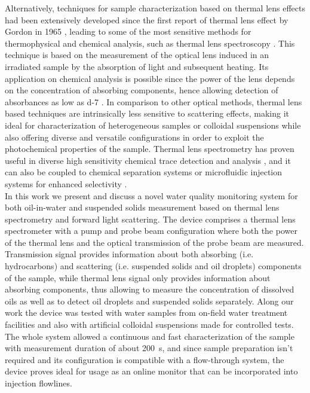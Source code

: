 \documentclass[9pt,twocolumn,twoside]{osajnl}
\begin{document}
Alternatively, techniques for sample characterization based on thermal lens effects had been extensively developed since the first report of thermal lens effect by Gordon in 1965 \cite{Gordon1965}, leading to some of the most sensitive methods for thermophysical and chemical analysis, such as thermal lens spectroscopy \cite{Franko2010,Liu2016}. This technique is based on the measurement of the optical lens induced in an irradiated sample by the absorption of light and subsequent heating. Its application on chemical analysis is possible since the power of the lens depends on the concentration of absorbing components, hence allowing detection of absorbances as low as \SI{d-7}{\arb} \cite{Proskurnin2015}. In comparison to other optical methods, thermal lens based techniques are intrinsically less sensitive to scattering effects, making it ideal for characterization of heterogeneous samples or colloidal suspensions while also offering diverse and versatile configurations in order to exploit the photochemical properties of the sample. Thermal lens spectrometry has proven useful in diverse high sensitivity chemical trace detection and analysis \cite{Sikovec1996,Franko2010}, and it can also be coupled to chemical separation systems or microfluidic injection systems for enhanced selectivity \cite{Liu2016}. \\

In this work we present and discuss a novel water quality monitoring system for both oil-in-water and suspended solids measurement based on thermal lens spectrometry and forward light scattering. The device comprises a thermal lens spectrometer with a pump and probe beam configuration where both the power of the thermal lens and the optical transmission of the probe beam are measured. Transmission signal provides information about both absorbing (i.e. hydrocarbons) and scattering (i.e. suspended solids and oil droplets) components of the sample, while thermal lens signal only provides information about absorbing components, thus allowing to measure the concentration of dissolved oils as well as to detect oil droplets and suspended solids separately. Along our work the device was tested with water samples from on-field water treatment facilities and also with artificial colloidal suspensions made for controlled tests. The whole system allowed a continuous and fast characterization of the sample with measurement duration of about \SI{200}{\second}, and since sample preparation isn't required and its configuration is compatible with a flow-through system, the device proves ideal for usage as an online monitor that can be incorporated into injection flowlines.
\end{document}
